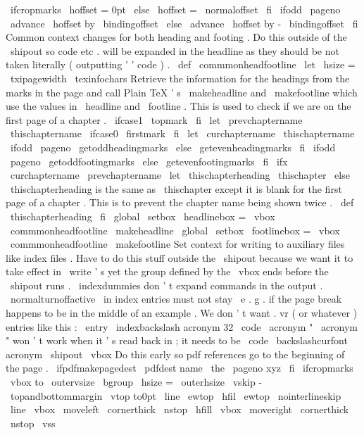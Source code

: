 {
%
\
ifcropmarks
\
hoffset
=
0pt
\
else
\
hoffset
=
\
normaloffset
\
fi
%
\
ifodd
\
pageno
\
advance
\
hoffset
by
\
bindingoffset
\
else
\
advance
\
hoffset
by
-
\
bindingoffset
\
fi
%
%
Common
context
changes
for
both
heading
and
footing
.
%
Do
this
outside
of
the
\
shipout
so
code
etc
.
will
be
expanded
in
%
the
headline
as
they
should
be
not
taken
literally
(
outputting
'
'
code
)
.
\
def
\
commmonheadfootline
{
\
let
\
hsize
=
\
txipagewidth
\
texinfochars
}
%
%
Retrieve
the
information
for
the
headings
from
the
marks
in
the
page
%
and
call
Plain
TeX
'
s
\
makeheadline
and
\
makefootline
which
use
the
%
values
in
\
headline
and
\
footline
.
%
%
This
is
used
to
check
if
we
are
on
the
first
page
of
a
chapter
.
\
ifcase1
\
topmark
\
fi
\
let
\
prevchaptername
\
thischaptername
\
ifcase0
\
firstmark
\
fi
\
let
\
curchaptername
\
thischaptername
%
\
ifodd
\
pageno
\
getoddheadingmarks
\
else
\
getevenheadingmarks
\
fi
\
ifodd
\
pageno
\
getoddfootingmarks
\
else
\
getevenfootingmarks
\
fi
%
\
ifx
\
curchaptername
\
prevchaptername
\
let
\
thischapterheading
\
thischapter
\
else
%
\
thischapterheading
is
the
same
as
\
thischapter
except
it
is
blank
%
for
the
first
page
of
a
chapter
.
This
is
to
prevent
the
chapter
name
%
being
shown
twice
.
\
def
\
thischapterheading
{
}
%
\
fi
%
\
global
\
setbox
\
headlinebox
=
\
vbox
{
\
commmonheadfootline
\
makeheadline
}
%
\
global
\
setbox
\
footlinebox
=
\
vbox
{
\
commmonheadfootline
\
makefootline
}
%
%
{
%
%
Set
context
for
writing
to
auxiliary
files
like
index
files
.
%
Have
to
do
this
stuff
outside
the
\
shipout
because
we
want
it
to
%
take
effect
in
\
write
'
s
yet
the
group
defined
by
the
\
vbox
ends
%
before
the
\
shipout
runs
.
%
\
indexdummies
%
don
'
t
expand
commands
in
the
output
.
\
normalturnoffactive
%
\
in
index
entries
must
not
stay
\
e
.
g
.
if
%
the
page
break
happens
to
be
in
the
middle
of
an
example
.
%
We
don
'
t
want
.
vr
(
or
whatever
)
entries
like
this
:
%
\
entry
{
{
\
indexbackslash
}
acronym
}
{
32
}
{
\
code
{
\
acronym
}
}
%
"
\
acronym
"
won
'
t
work
when
it
'
s
read
back
in
;
%
it
needs
to
be
%
{
\
code
{
{
\
backslashcurfont
}
acronym
}
\
shipout
\
vbox
{
%
%
Do
this
early
so
pdf
references
go
to
the
beginning
of
the
page
.
\
ifpdfmakepagedest
\
pdfdest
name
{
\
the
\
pageno
}
xyz
\
fi
%
\
ifcropmarks
\
vbox
to
\
outervsize
\
bgroup
\
hsize
=
\
outerhsize
\
vskip
-
\
topandbottommargin
\
vtop
to0pt
{
%
\
line
{
\
ewtop
\
hfil
\
ewtop
}
%
\
nointerlineskip
\
line
{
%
\
vbox
{
\
moveleft
\
cornerthick
\
nstop
}
%
\
hfill
\
vbox
{
\
moveright
\
cornerthick
\
nstop
}
%
}
%
\
vss
}
%
}}}}
